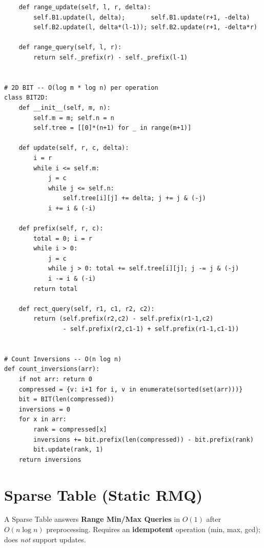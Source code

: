 \documentclass[11pt,a4paper]{report}
\begin{document}
\begin{lstlisting}
    def range_update(self, l, r, delta):
        self.B1.update(l, delta);       self.B1.update(r+1, -delta)
        self.B2.update(l, delta*(l-1)); self.B2.update(r+1, -delta*r)

    def range_query(self, l, r):
        return self._prefix(r) - self._prefix(l-1)


# 2D BIT -- O(log m * log n) per operation
class BIT2D:
    def __init__(self, m, n):
        self.m = m; self.n = n
        self.tree = [[0]*(n+1) for _ in range(m+1)]

    def update(self, r, c, delta):
        i = r
        while i <= self.m:
            j = c
            while j <= self.n:
                self.tree[i][j] += delta; j += j & (-j)
            i += i & (-i)

    def prefix(self, r, c):
        total = 0; i = r
        while i > 0:
            j = c
            while j > 0: total += self.tree[i][j]; j -= j & (-j)
            i -= i & (-i)
        return total

    def rect_query(self, r1, c1, r2, c2):
        return (self.prefix(r2,c2) - self.prefix(r1-1,c2)
                - self.prefix(r2,c1-1) + self.prefix(r1-1,c1-1))


# Count Inversions -- O(n log n)
def count_inversions(arr):
    if not arr: return 0
    compressed = {v: i+1 for i, v in enumerate(sorted(set(arr)))}
    bit = BIT(len(compressed))
    inversions = 0
    for x in arr:
        rank = compressed[x]
        inversions += bit.prefix(len(compressed)) - bit.prefix(rank)
        bit.update(rank, 1)
    return inversions
\end{lstlisting}

\chapter{Sparse Table (Static RMQ)}

A Sparse Table answers \textbf{Range Min/Max Queries} in $O(1)$ after $O(n \log n)$ preprocessing.
Requires an \textbf{idempotent} operation (min, max, gcd); does \emph{not} support updates.
\end{document}
